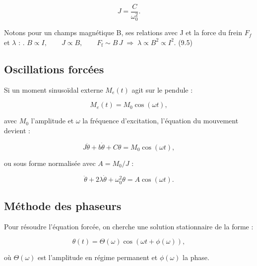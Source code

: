 \begin{equation}
J = \frac{C}{\omega_0^2}.
\label{eq:J}
\end{equation}

Notons pour un champs magnétique B, ses relations avec J et la force du frein $F_f$ et $\lambda$ :
.\hspace{3.5cm} $B \propto I,\qquad J \propto B,\qquad F_{\text{f}} \sim B\,J 
\;\Rightarrow\; \lambda \propto B^{2} \propto I^{2}.$ \hspace{2.4cm}(9.5)


\subsection{Oscillations forcées} \label{sec:forcee}

Si un moment sinusoïdal externe $M_e(t)$ agit sur le pendule :

\begin{equation}
M_e(t) = M_0\cos(\omega t),
\label{eq:moment_excitation}
\end{equation}

avec $M_0$ l’amplitude et $\omega$ la fréquence d’excitation, l’équation du mouvement devient :

\begin{equation}
J\ddot{\theta} + b\dot{\theta} + C\theta = M_0\cos(\omega t),
\label{eq:equa_forcee_brut}
\end{equation}

ou sous forme normalisée avec $A = M_0/J$ :

\begin{equation}
\ddot{\theta}+2\lambda\dot{\theta}+\omega_0^2\theta
= A\cos(\omega t).
\label{eq:equa_forcee_normalisee}
\end{equation}

\subsection{Méthode des phaseurs} \label{subsec:phaseurs}

Pour résoudre l’équation forcée, on cherche une solution stationnaire de la forme :

\begin{equation}
\theta(t)=\Theta(\omega)\cos(\omega t+\phi(\omega)),
\label{eq:solution_phaseurs}
\end{equation}

où $\Theta(\omega)$ est l’amplitude en régime permanent et $\phi(\omega)$ la phase.

